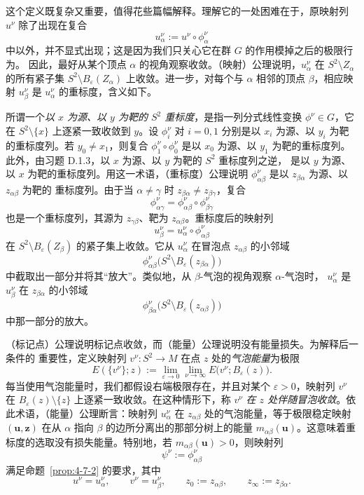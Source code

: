 这个定义既复杂又重要，值得花些篇幅解释。理解它的一处困难在于，原映射列 $u^\nu$
除了出现在复合
\[
  u_\alpha^\nu:=u^\nu\circ\phi_\alpha^\nu
\]
中以外，并不显式出现；这是因为我们只关心它在群 $G$ 的作用模掉之后的极限行为。
因此，最好从某个顶点 $\alpha$ 的视角观察收敛。（映射）公理说明，$u_\alpha^\nu$
在 $S^2\setminus Z_\alpha$ 的所有紧子集
$S^2\setminus B_\varepsilon(Z_\alpha)$ 上收敛。进一步，对每个与 $\alpha$ 相邻的顶点
$\beta$，相应映射 $u_\beta^\nu$ 是 $u_\alpha^\nu$ 的重标度，含义如下。

所谓一个\emph{以 $x$ 为源、以 $y$ 为靶的 $S^2$ 重标度}，是指一列分式线性变换
$\phi^\nu\in G$，它在 $S^2\setminus\{x\}$ 上逐紧一致收敛到 $y$。设
$\phi_i^\nu$ 对 $i=0,1$ 分别是以 $x_i$ 为源、以 $y_i$ 为靶的重标度列。若
$y_0\ne x_1$，则复合 $\phi_1^\nu\circ\phi_0^\nu$ 是以 $x_0$ 为源、以 $y_1$
为靶的重标度列。此外，由习题 D.1.3，以 $x$ 为源、以 $y$ 为靶的 $S^2$ 重标度列之逆，
是以 $y$ 为源、以 $x$ 为靶的重标度列。用这一术语，（重标度）公理说明
$\phi_{\alpha\beta}^\nu$ 是以 $z_{\beta\alpha}$ 为源、以 $z_{\alpha\beta}$ 为靶的
重标度列。由于当 $\alpha\ne\gamma$ 时
$z_{\beta\alpha}\ne z_{\beta\gamma}$，复合
\[
  \phi_{\alpha\gamma}^\nu
  =\phi_{\alpha\beta}^\nu\circ\phi_{\beta\gamma}^\nu
\]
也是一个重标度列，其源为 $z_{\gamma\beta}$、靶为 $z_{\alpha\beta}$。重标度后的映射列
\[
  u_\beta^\nu=u_\alpha^\nu\circ\phi_{\alpha\beta}^\nu
\]
在 $S^2\setminus B_\varepsilon(Z_\beta)$ 的紧子集上收敛。它从
$u_\alpha^\nu$ 在冒泡点 $z_{\alpha\beta}$ 的小邻域
\[
  \phi_{\alpha\beta}^\nu
  \bigl(S^2\setminus B_\varepsilon(z_{\beta\alpha})\bigr)
\]
中截取出一部分并将其“放大”。类似地，从 $\beta$-气泡的视角观察 $\alpha$-气泡时，
$u_\alpha^\nu$ 是 $u_\beta^\nu$ 在 $z_{\beta\alpha}$ 的小邻域
\[
  \phi_{\beta\alpha}^\nu
  \bigl(S^2\setminus B_\varepsilon(z_{\alpha\beta})\bigr)
\]
中那一部分的放大。

（标记点）公理说明标记点收敛，而（能量）公理说明没有能量损失。为解释后一条件的
重要性，定义映射列 $v^\nu:S^2\to M$ 在点 $z$ 处的\emph{气泡能量}为极限
\[
  E(\{v^\nu\};z)
  :=\lim_{\varepsilon\to0}\lim_{\nu\to\infty}
  E\bigl(v^\nu;B_\varepsilon(z)\bigr).
\]
每当使用气泡能量时，我们都假设右端极限存在，并且对某个 $\varepsilon>0$，映射列
$v^\nu$ 在 $B_\varepsilon(z)\setminus\{z\}$ 上逐紧一致收敛。在这种情形下，称
$v^\nu$ \emph{在 $z$ 处伴随冒泡收敛}。依此术语，（能量）公理断言：映射列
$u_\alpha^\nu$ 在 $z_{\alpha\beta}$ 处的气泡能量，等于极限稳定映射
$(\mathbf u,\mathbf z)$ 在从 $\alpha$ 指向 $\beta$ 的边所分离出的那部分树上的能量
$m_{\alpha\beta}(\mathbf u)$。这意味着重标度的选取没有损失能量。特别地，若
$m_{\alpha\beta}(\mathbf u)>0$，则映射列
\[
  \psi^\nu:=\phi_{\alpha\beta}^\nu
\]
满足命题~\ref{prop:4-7-2} 的要求，其中
\[
  u^\nu=u_\alpha^\nu,
  \qquad v^\nu=u_\beta^\nu,
  \qquad z_0:=z_{\alpha\beta},
  \qquad z_\infty:=z_{\beta\alpha}.
\]

